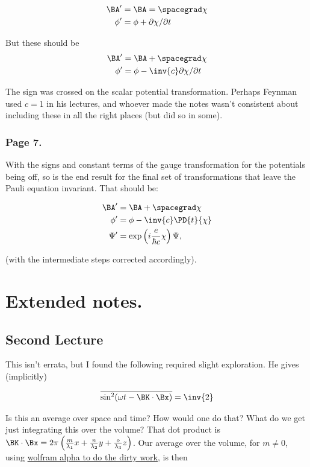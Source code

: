 \begin{align*}
\BA' &= \BA = \spacegrad \chi \\
\phi' &= \phi + \partial \chi / \partial t
\end{align*}

But these should be
\begin{align*}
\BA' &= \BA + \spacegrad \chi \\
\phi' &= \phi - \inv{c} \partial \chi / \partial t
\end{align*}

The sign was crossed on the scalar potential transformation.  Perhaps Feynman used $c=1$ in his lectures, and whoever made the notes wasn't consistent about including these in all the right places (but did so in some).

\subsubsection{Page 7.}

With the signs and constant terms of the gauge transformation for the potentials being off, so is the end result for the final set of transformations that leave the Pauli equation invariant.  That should be:

\begin{align*}
\BA' &= \BA + \spacegrad \chi \\
\phi' &= \phi - \inv{c} \PD{t}{ \chi } \\
\Psi' &= \exp\left( i \frac{e}{ \hbar c } \chi \right) \Psi,
\end{align*}

(with the intermediate steps corrected accordingly).

\section{Extended notes.}

\subsection{Second Lecture}

This isn't errata, but I found the following required slight exploration.  He gives (implicitly)

\begin{align*}
\overline{\sin^2(\omega t - \BK \cdot \Bx)} = \inv{2}
\end{align*}

Is this an average over space and time?  How would one do that?  What do we get just integrating this over the volume?  That dot product is $\BK \cdot \Bx = 2 \pi \left(\frac{m}{\lambda_1} x + \frac{n}{\lambda_2} y + \frac{o}{\lambda_3} z \right)$.  Our average over the volume, for $m \ne 0$, using \href{http://www.wolframalpha.com/input/?i=\int+sin^2(a+x+%2B+b)+dx}{wolfram alpha to do the dirty work}, is then

